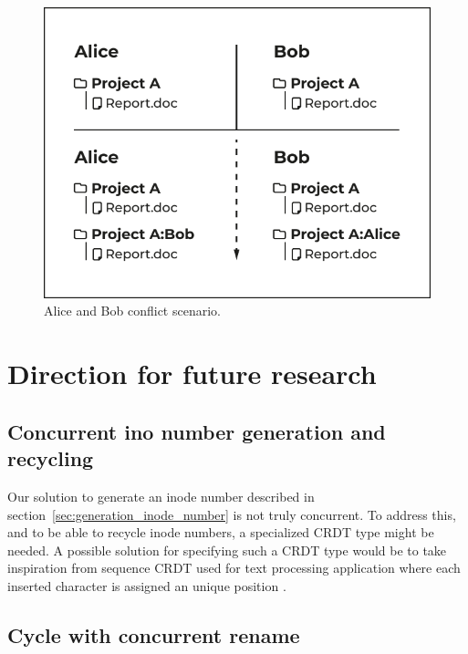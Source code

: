 \documentclass[sigconf,anonymous,10pt]{acmart}
\begin{document}
\begin{figure}[h]
	\caption{Alice and Bob conflict scenario.}
	\centering
	\includegraphics[scale=0.5]{AliceBob-font-des-fichiers.pdf}
\end{figure}

\section{Direction for future research}
\label{crdt:future}

\subsection{Concurrent ino number generation and recycling}

Our solution to generate an inode number described in section~\ref{sec:generation_inode_number}
is not truly concurrent.
To address this, and to be able to recycle inode numbers,
a specialized CRDT type might be needed.
A possible solution for specifying such a CRDT type would be to take inspiration
from sequence CRDT used for text processing application where each inserted
character is assigned an unique position \cite{nedelec2013lseq, letia2009crdts}.

\subsection{Cycle with concurrent rename}
\end{document}
